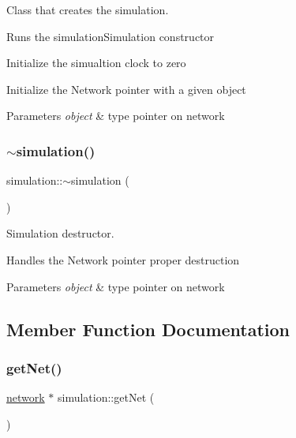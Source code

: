 Class that creates the simulation. 

Runs the simulation\+Simulation constructor

Initialize the simualtion clock to zero

Initialize the Network pointer with a given object 
\begin{DoxyParams}{Parameters}
{\em object} & type pointer on network \\
\hline
\end{DoxyParams}
\mbox{\label{classsimulation_ac84df84c712163d5378db4b4fe62bc98}} 
\subsubsection{\texorpdfstring{$\sim$simulation()}{~simulation()}}
{\footnotesize\ttfamily simulation\+::$\sim$simulation (\begin{DoxyParamCaption}{ }\end{DoxyParamCaption})}



Simulation destructor. 

Handles the Network pointer proper destruction


\begin{DoxyParams}{Parameters}
{\em object} & type pointer on network \\
\hline
\end{DoxyParams}


\subsection{Member Function Documentation}
\mbox{\label{classsimulation_a9bde1d986780e0980d1de6c57d814532}} 
\subsubsection{\texorpdfstring{get\+Net()}{getNet()}}
{\footnotesize\ttfamily \hyperlink{classnetwork}{network} $\ast$ simulation\+::get\+Net (\begin{DoxyParamCaption}{ }\end{DoxyParamCaption})}



